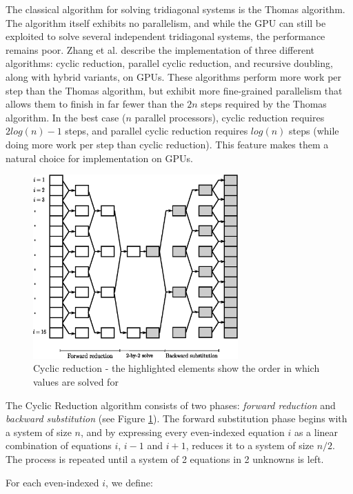 \documentclass{elsarticle}
\begin{document}
The classical algorithm for solving tridiagonal systems is
the Thomas algorithm.
The algorithm itself exhibits no parallelism,
and while the GPU can still be exploited to solve
several independent tridiagonal systems,
the performance remains poor.
Zhang et al. \cite{Zhange2010FTS}
describe the implementation of three different algorithms:
cyclic reduction, parallel cyclic reduction, and
recursive doubling,
along with hybrid variants,
on GPUs.
These algorithms perform more work per step than
the Thomas algorithm,
but exhibit more fine-grained parallelism
that allows them to finish in
far fewer than the $2n$ steps required by the Thomas algorithm.
In the best case ($n$ parallel processors),
cyclic reduction requires 
$2log(n) - 1$ steps,
and parallel cyclic reduction requires
$log(n)$ steps
(while doing more work per step than cyclic reduction).
This feature makes them a natural choice for
implementation on GPUs.

\begin{figure}[h!]
\begin{center}
\includegraphics[height=200pt]{img/cyclic-reduction.eps}
\end{center}
\caption{Cyclic reduction - the highlighted elements
show the order in which values are solved for}
\label{fig:cyclic-reduction}
\end{figure}

The Cyclic Reduction algorithm consists of two phases:
\emph{forward reduction} and \emph{backward substitution}
(see Figure \ref{fig:cyclic-reduction}).
The forward substitution phase begins with a system of size $n$,
and by expressing every even-indexed equation $i$ as a linear
combination of equations $i$, $i-1$ and $i+1$, reduces it to a
system of size $n/2$.
The process is repeated until a system of 2 equations in 2 unknowns
is left.

For each even-indexed $i$, we define:
\end{document}
